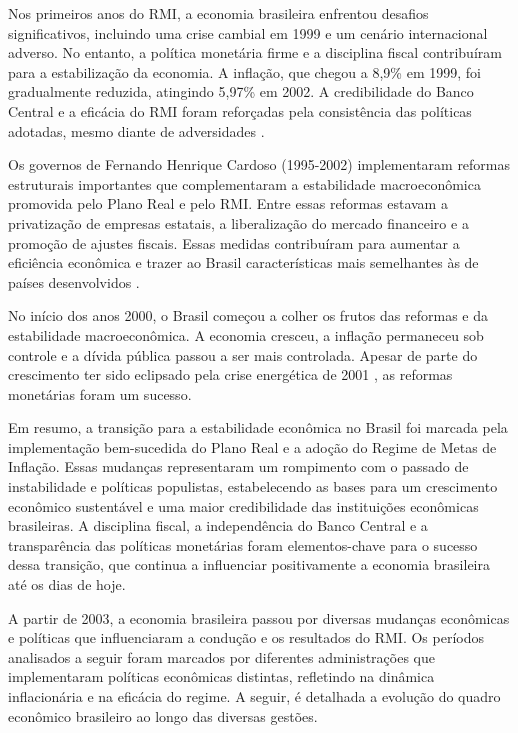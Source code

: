\documentclass[12pt,oneside,a4paper,chapter=TITLE,english,brazil,sumario=abnt-6027-2012]{abntex2}
\begin{document}
Nos primeiros anos do RMI, a economia brasileira enfrentou desafios significativos, incluindo uma crise cambial em 1999 e um cenário internacional adverso. No entanto, a política monetária firme e a disciplina fiscal contribuíram para a estabilização da economia. A inflação, que chegou a 8,9\% em 1999, foi gradualmente reduzida, atingindo 5,97\% em 2002. A credibilidade do Banco Central e a eficácia do RMI foram reforçadas pela consistência das políticas adotadas, mesmo diante de adversidades \cite{fabiogiambiagi_1999_a}.

Os governos de Fernando Henrique Cardoso (1995-2002) implementaram reformas estruturais importantes que complementaram a estabilidade macroeconômica promovida pelo Plano Real e pelo RMI. Entre essas reformas estavam a privatização de empresas estatais, a liberalização do mercado financeiro e a promoção de ajustes fiscais. Essas medidas contribuíram para aumentar a eficiência econômica e trazer ao Brasil características mais semelhantes às de países desenvolvidos \cite{fabiogiambiagi_2016_economia}.

No início dos anos 2000, o Brasil começou a colher os frutos das reformas e da estabilidade macroeconômica. A economia cresceu, a inflação permaneceu sob controle e a dívida pública passou a ser mais controlada. Apesar de parte do crescimento ter sido eclipsado pela crise energética de 2001 \cite{fabiogiambiagi_2016_economia}, as reformas monetárias foram um sucesso.

Em resumo, a transição para a estabilidade econômica no Brasil foi marcada pela implementação bem-sucedida do Plano Real e a adoção do Regime de Metas de Inflação. Essas mudanças representaram um rompimento com o passado de instabilidade e políticas populistas, estabelecendo as bases para um crescimento econômico sustentável e uma maior credibilidade das instituições econômicas brasileiras. A disciplina fiscal, a independência do Banco Central e a transparência das políticas monetárias foram elementos-chave para o sucesso dessa transição, que continua a influenciar positivamente a economia brasileira até os dias de hoje.

A partir de 2003, a economia brasileira passou por diversas mudanças econômicas e políticas que influenciaram a condução e os resultados do RMI. Os períodos analisados a seguir foram marcados por diferentes administrações que implementaram políticas econômicas distintas, refletindo na dinâmica inflacionária e na eficácia do regime. A seguir, é detalhada a evolução do quadro econômico brasileiro ao longo das diversas gestões.
\end{document}
